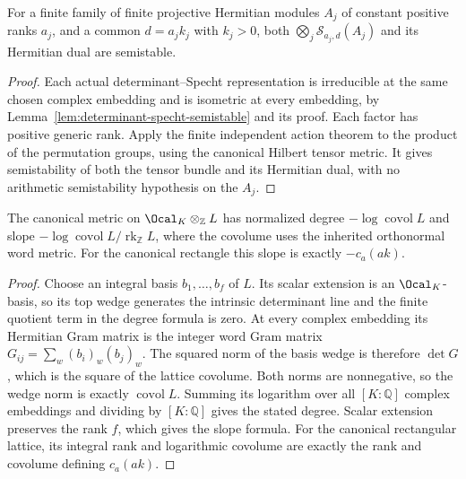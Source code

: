 \begin{lemma}
\label{lem:determinant-specht-family-semistable}
\leanok
For a finite family of finite projective Hermitian modules $A_j$ of
constant positive ranks $a_j$, and a common $d=a_jk_j$ with $k_j>0$,
both $\bigotimes_j\mathcal S_{a_j,d}(A_j)$ and its Hermitian dual are
semistable.
\end{lemma}
\begin{proof}
Each actual determinant--Specht representation is irreducible at the
same chosen complex embedding and is isometric at every embedding, by
Lemma~\ref{lem:determinant-specht-semistable} and its proof. Each factor
has positive generic rank. Apply the finite independent action theorem
to the product of the permutation groups, using the canonical Hilbert
tensor metric. It gives semistability of both the tensor bundle and its
Hermitian dual, with no arithmetic semistability hypothesis on the $A_j$.
\end{proof}

\begin{lemma}
\label{lem:arithmetic-specht-degree}
\leanok
The canonical metric on $\Ocal_K\otimes_{\mathbb Z}L$ has normalized
degree $-\log\operatorname{covol}L$ and slope
$-\log\operatorname{covol}L/\operatorname{rk}_{\mathbb Z}L$, where the
covolume uses the inherited orthonormal word metric.
For the canonical rectangle this slope is exactly $-c_a(ak)$.
\end{lemma}
\begin{proof}
Choose an integral basis $b_1,\ldots,b_f$ of $L$. Its scalar extension
is an $\Ocal_K$-basis, so its top wedge generates the intrinsic
determinant line and the finite quotient term in the degree formula
is zero. At every complex embedding its Hermitian Gram matrix is the
integer word Gram matrix $G_{ij}=\sum_w(b_i)_w(b_j)_w$. The squared
norm of the basis wedge is therefore $\det G$, which is the square
of the lattice covolume. Both norms are nonnegative, so the wedge norm
is exactly $\operatorname{covol}L$. Summing its logarithm over all
$[K:\mathbb Q]$ complex embeddings and dividing by $[K:\mathbb Q]$
gives the stated degree. Scalar extension preserves the rank $f$,
which gives the slope formula.
For the canonical rectangular lattice, its integral rank and logarithmic
covolume are exactly the rank and covolume defining $c_a(ak)$.
\end{proof}

